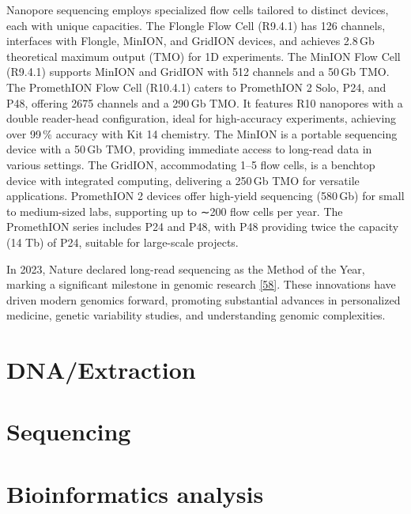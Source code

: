 \documentclass[
  letterpaper,
  DIV=11,
  numbers=noendperiod]{scrreprt}
\begin{document}
Nanopore sequencing employs specialized flow cells tailored to distinct
devices, each with unique capacities. The Flongle Flow Cell (R9.4.1) has
126 channels, interfaces with Flongle, MinION, and GridION devices, and
achieves 2.8\,Gb theoretical maximum output (TMO) for 1D experiments.
The MinION Flow Cell (R9.4.1) supports MinION and GridION with 512
channels and a 50\,Gb TMO. The PromethION Flow Cell (R10.4.1) caters to
PromethION 2 Solo, P24, and P48, offering 2675 channels and a 290\,Gb
TMO. It features R10 nanopores with a double reader-head configuration,
ideal for high-accuracy experiments, achieving over 99\,\% accuracy with
Kit 14 chemistry. The MinION is a portable sequencing device with a
50\,Gb TMO, providing immediate access to long-read data in various
settings. The GridION, accommodating 1--5 flow cells, is a benchtop
device with integrated computing, delivering a 250\,Gb TMO for versatile
applications. PromethION 2 devices offer high-yield sequencing (580\,Gb)
for small to medium-sized labs, supporting up to ∼200 flow cells per
year. The PromethION series includes P24 and P48, with P48 providing
twice the capacity (14 Tb) of P24, suitable for large-scale projects.

In 2023, Nature declared long-read sequencing as the Method of the Year,
marking a significant milestone in genomic research
\href{https://www.sciencedirect.com/science/article/pii/S1872497324001522\#bib58}{{[}58{]}}.
These innovations have driven modern genomics forward, promoting
substantial advances in personalized medicine, genetic variability
studies, and understanding genomic complexities.

\section{DNA/Extraction}\label{dnaextraction}

\section{Sequencing}\label{sequencing}

\section{Bioinformatics analysis}\label{bioinformatics-analysis}
\end{document}
